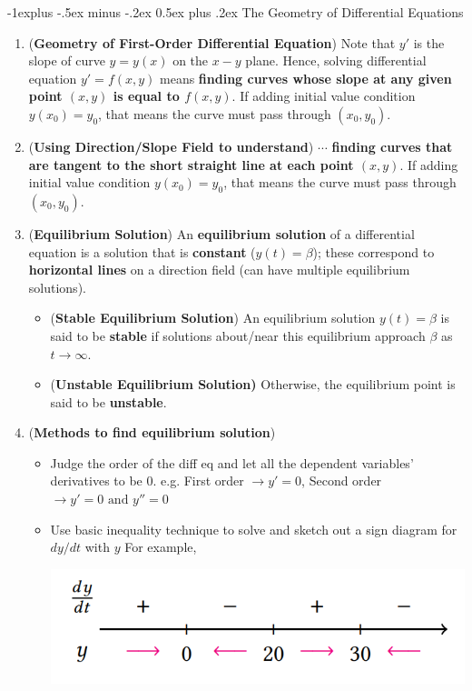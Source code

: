 \documentclass[10pt, landscape]{article}
\makeatletter
\renewcommand{\subsection}{\@startsection{subsection}{2}{0mm}%
                                {-1explus -.5ex minus -.2ex}%
                                {0.5ex plus .2ex}%
                                {\normalfont\normalsize\bfseries}}
\makeatother
\begin{document}
\begin{multicols}{4}
\subsection{The Geometry of Differential Equations}
\begin{enumerate}
    \item (\textbf{Geometry of First-Order Differential Equation}) Note that $y'$ is the slope of curve $y=y(x)$ on the $x-y$ plane. Hence, solving differential equation $y'=f(x,y)$ means \textbf{finding curves whose slope at any given point $(x,y)$ is equal to $f(x,y)$}. If adding initial value condition $y(x_0)=y_0$, that means the curve must pass through $(x_0, y_0)$.
    \item (\textbf{Using Direction/Slope Field to understand}) $\cdots$ \textbf{finding curves that are tangent to the short straight line at each point $(x,y)$}. If adding initial value condition $y(x_0)=y_0$, that means the curve must pass through $(x_0, y_0)$.
    \item (\textbf{Equilibrium Solution}) An \textbf{equilibrium solution} of a differential equation is a solution that is \textbf{constant} ($y(t)=\beta$); these correspond to \textbf{horizontal lines} on a direction field (can have multiple equilibrium solutions).
    \begin{itemize}
        \item (\textbf{Stable Equilibrium Solution}) An equilibrium solution $y(t)=\beta$ is said to be \textbf{stable} if solutions about/near this equilibrium approach $\beta$ as $t\to \infty$.
        \item (\textbf{Unstable Equilibrium Solution)} Otherwise, the equilibrium point is said to be \textbf{unstable}.
    \end{itemize}
    \item (\textbf{Methods to find equilibrium solution})
    \begin{itemize}
        \item Judge the order of the diff eq and let all the dependent variables' derivatives to be 0. e.g. First order $\rightarrow y'=0$, Second order $\rightarrow y'=0 \text{ and } y''=0$ 
        \item Use basic inequality technique to solve and sketch out a sign diagram for $dy/dt$ with $y$ For example,\\
        \centerline{\includegraphics[width=0.9\linewidth]{image/sign-diagram-for-dydt.png}}

\end{itemize}
\end{enumerate}
\end{multicols}
\end{document}
